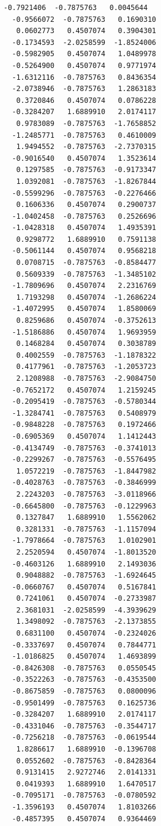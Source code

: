 \documentclass[11pt]{article}
\begin{document}
\begin{Verbatim}[commandchars=\\\{\}]
  -0.7921406  -0.7875763   0.0045644
  -0.9566072  -0.7875763   0.1690310
   0.0602773   0.4507074   0.3904301
  -0.1734593  -2.0258599  -1.8524006
  -0.5982905   0.4507074   1.0489978
  -0.5264900   0.4507074   0.9771974
  -1.6312116  -0.7875763   0.8436354
  -2.0738946  -0.7875763   1.2863183
   0.3720846   0.4507074   0.0786228
  -0.3284207   1.6889910   2.0174117
   0.9783089  -0.7875763  -1.7658852
  -1.2485771  -0.7875763   0.4610009
   1.9494552  -0.7875763  -2.7370315
  -0.9016540   0.4507074   1.3523614
   0.1297585  -0.7875763  -0.9173347
   1.0392081  -0.7875763  -1.8267844
  -0.5599296  -0.7875763  -0.2276466
   0.1606336   0.4507074   0.2900737
  -1.0402458  -0.7875763   0.2526696
  -1.0428318   0.4507074   1.4935391
   0.9298772   1.6889910   0.7591138
  -0.5061144   0.4507074   0.9568218
   0.0708715  -0.7875763  -0.8584477
   0.5609339  -0.7875763  -1.3485102
  -1.7809696   0.4507074   2.2316769
   1.7193298   0.4507074  -1.2686224
  -1.4072995   0.4507074   1.8580069
   0.8259686   0.4507074  -0.3752613
  -1.5186886   0.4507074   1.9693959
   0.1468284   0.4507074   0.3038789
   0.4002559  -0.7875763  -1.1878322
   0.4177961  -0.7875763  -1.2053723
   2.1208988  -0.7875763  -2.9084750
  -0.7652172   0.4507074   1.2159245
  -0.2095419  -0.7875763  -0.5780344
  -1.3284741  -0.7875763   0.5408979
  -0.9848228  -0.7875763   0.1972466
  -0.6905369   0.4507074   1.1412443
  -0.4134749  -0.7875763  -0.3741013
  -0.2299267  -0.7875763  -0.5576495
   1.0572219  -0.7875763  -1.8447982
  -0.4028763  -0.7875763  -0.3846999
   2.2243203  -0.7875763  -3.0118966
  -0.6645800  -0.7875763  -0.1229963
   0.1327847   1.6889910   1.5562062
   0.3281331  -0.7875763  -1.1157094
  -1.7978664  -0.7875763   1.0102901
   2.2520594   0.4507074  -1.8013520
  -0.4603126   1.6889910   2.1493036
   0.9048882  -0.7875763  -1.6924645
  -0.0660767   0.4507074   0.5167841
   0.7241061   0.4507074  -0.2733987
   2.3681031  -2.0258599  -4.3939629
   1.3498092  -0.7875763  -2.1373855
   0.6831100   0.4507074  -0.2324026
  -0.3337697   0.4507074   0.7844771
  -1.0186825   0.4507074   1.4693899
  -0.8426308  -0.7875763   0.0550545
  -0.3522263  -0.7875763  -0.4353500
  -0.8675859  -0.7875763   0.0800096
  -0.9501499  -0.7875763   0.1625736
  -0.3284207   1.6889910   2.0174117
  -0.4331046  -0.7875763  -0.3544717
  -0.7256218  -0.7875763  -0.0619544
   1.8286617   1.6889910  -0.1396708
   0.0552602  -0.7875763  -0.8428364
   0.9131415   2.9272746   2.0141331
   0.0419393   1.6889910   1.6470517
  -0.7095171  -0.7875763  -0.0780592
  -1.3596193   0.4507074   1.8103266
  -0.4857395   0.4507074   0.9364469

\end{Verbatim}
\end{document}
